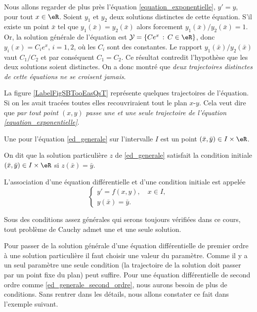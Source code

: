 \begin{example}
  Nous allons regarder de plus près l'équation \eqref{equation_exponentielle}, $y'=y$, pour tout $x\in\eR$. Soient $y_1$ et $y_2$ deux solutions distinctes de cette équation. S'il existe un point $\bar x$ tel que $y_1(\bar x) = y_2 (\bar x)$ alors forcement $y_1(\bar x)/y_2 (\bar x)=1$. Or, la solution générale de l'équation est \(\mathcal{Y} = \{Ce^x\, : \, C\in\eR\}\), donc $y_i(x) = C_ie^x$, $i= 1,2$, o\`u les $C_i$ sont des constantes. Le rapport $y_1(\bar x)/y_2 (\bar x)$ vaut $C_1/C_2$ et par conséquent $C_1 = C_2$. Ce résultat contredit l'hypothèse que les deux solutions soient distinctes. On a donc montré que \emph{deux trajectoires distinctes de cette équations ne se croisent jamais}. 

\newcommand{\CaptionFigSBTooEasQsT}{Quelque trajectoires de l'équation \( y'=y\).}


La figure \ref{LabelFigSBTooEasQsT} représente quelques trajectoires de l'équation. Si on les avait tracées toutes elles recouvriraient tout le plan $x$-$y$. Cela veut dire que \emph{par tout point $(x,y)$ passe une et une seule trajectoire de l'équation \eqref{equation_exponentielle}}. 

\end{example}
\begin{definition}
  Une  pour l'équation \eqref{ed_generale} sur l'intervalle \(I\) est un point \((\bar x, \bar y)\in I\times\eR\). 

On dit que la solution particulière \(z\) de \eqref{ed_generale} satisfait la condition initiale \((\bar x, \bar y)\in I\times\eR\) si \(z(\bar x) =\bar y\).
\end{definition}
\begin{definition}
  L'association d'une équation différentielle et d'une condition initiale est appelée 
  \begin{equation}\label{plme_cauchy}
    \begin{cases}
      y'= f(x,y), \quad x\in I, \\
      y(\bar x) = \bar y.
    \end{cases}
  \end{equation}
\end{definition}
\begin{remark}
  Sous des conditions assez générales qui serons toujours vérifiées dans ce cours, tout problème de Cauchy admet une et une seule solution.  
\end{remark}
Pour passer de la solution générale d'une équation différentielle de premier ordre \`a une solution particulière il faut choisir une valeur du paramètre. Comme il y a un seul paramètre une seule condition (la trajectoire de la solution doit passer par un point fixe du plan) peut suffire. Pour une équation différentielle de second ordre comme \eqref{ed_generale_second_ordre}, nous aurons besoin de plus de conditions. Sans rentrer dans les détails, nous allons constater ce fait dans l'exemple suivant. 

